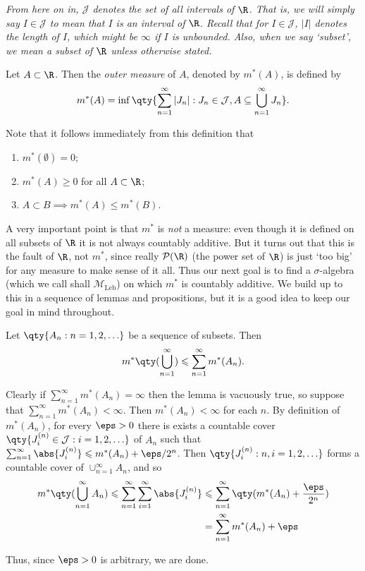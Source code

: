 \documentclass{maths}
\newcommand{\mleb}{\mathcal{M}_{\text{Leb}}}
\newcommand{\intvl}{\mathcal{J}}
\begin{document}
\emph{From here on in, $\intvl$ denotes the set of all intervals of $\R$.
That is, we will simply say $I\in\intvl$ to mean that $I$ is an interval of $\R$.
Recall that for $I\in\intvl$, $|I|$ denotes the length of $I$, which might be $\infty$ if $I$ is unbounded.
Also, when we say `subset', we mean a subset of $\R$ unless otherwise stated.}

\begin{defn}
    Let $A\subset\R$.
    Then the \emph{outer measure} of $A$, denoted by $m^*(A)$, is defined by
    \[
        m^*(A) =
        \inf\qty{\sum_{n=1}^{\infty} |J_n| : J_n\in\intvl, A\subseteq\bigcup_{n=1}^{\infty} J_n}.
    \]

    Note that it follows immediately from this definition that
    \begin{enumerate}
        \item $m^*(\emptyset)=0$;
        \item $m^*(A)\geqslant0$ for all $A\subset\R$;
        \item $A\subset B\implies m^*(A)\leqslant m^*(B)$.
    \end{enumerate}
\end{defn}

A very important point is that $m^*$ is \emph{not} a measure: even though it is defined on all subsets of $\R$ it is not always countably additive.
But it turns out that this is the fault of $\R$, not $m^*$, since really $\mathcal{P}(\R)$ (the power set of $\R$) is just `too big' for any measure to make sense of it all.
Thus our next goal is to find a $\sigma$-algebra (which we call shall $\mleb$) on which $m^*$ is countably additive.
We build up to this in a sequence of lemmas and propositions, but it is a good idea to keep our goal in mind throughout.

\begin{lem}
    Let $\qty{A_n : n = 1,2,\ldots}$ be a sequence of subsets.
    Then
    \[
        m^*\qty(\bigcup_{n=1}^{\infty}) \leqslant
        \sum_{n=1}^{\infty} m^*(A_n).
    \]
\end{lem}

\begin{prf}
    Clearly if $\sum_{n=1}^{\infty} m^*(A_n) = \infty$ then the lemma is vacuously true, so suppose that $\sum_{n=1}^{\infty} m^*(A_n) < \infty$.
    Then $m^*(A_n) < \infty$ for each $n$.
    By definition of $m^*(A_n)$, for every $\eps>0$ there is exists a countable cover $\qty{J_i^{(n)}\in\intvl : i = 1,2,\ldots}$ of $A_n$ such that $\sum_{n=1}^{\infty} \abs{J_i^{(n)}} \leqslant m^*(A_n) + \eps/2^n$.
    Then $\qty{J_i^{(n)} : n,i = 1,2,\ldots}$ forms a countable cover of $\cup_{n=1}^{\infty} A_n$, and so
    \begin{align*}
        m^*\qty(\bigcup_{n=1}^{\infty} A_n) \leqslant
        \sum_{n=1}^{\infty} \sum_{i=1}^{\infty} \abs{J_i^{(n)}}
        &\leqslant \sum_{n=1}^{\infty} \qty(m^*(A_n) + \frac{\eps}{2^n})\\
        &= \sum_{n=1}^{\infty} m^*(A_n) + \eps
    \end{align*}

    Thus, since $\eps>0$ is arbitrary, we are done.
\end{prf}
\end{document}
